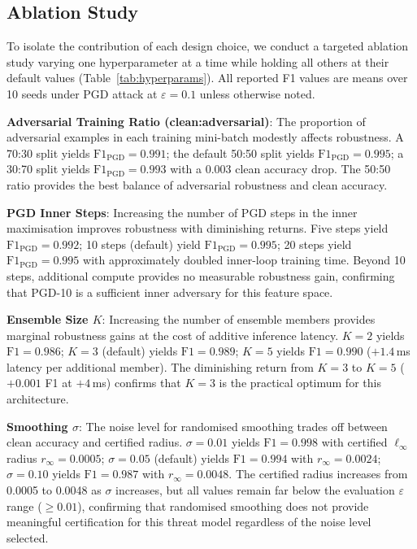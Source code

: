 \documentclass[conference]{IEEEtran}
\begin{document}
\subsection{Ablation Study}
\label{sec:ablation}

To isolate the contribution of each design choice, we conduct a targeted ablation study varying one hyperparameter at a time while holding all others at their default values (Table~\ref{tab:hyperparams}). All reported F1 values are means over 10 seeds under PGD attack at $\varepsilon=0.1$ unless otherwise noted.

\textbf{Adversarial Training Ratio (clean:adversarial)}: The proportion of adversarial examples in each training mini-batch modestly affects robustness. A 70:30 split yields $\text{F1}_{\text{PGD}}=0.991$; the default 50:50 split yields $\text{F1}_{\text{PGD}}=0.995$; a 30:70 split yields $\text{F1}_{\text{PGD}}=0.993$ with a 0.003 clean accuracy drop. The 50:50 ratio provides the best balance of adversarial robustness and clean accuracy.

\textbf{PGD Inner Steps}: Increasing the number of PGD steps in the inner maximisation improves robustness with diminishing returns. Five steps yield $\text{F1}_{\text{PGD}}=0.992$; 10 steps (default) yield $\text{F1}_{\text{PGD}}=0.995$; 20 steps yield $\text{F1}_{\text{PGD}}=0.995$ with approximately doubled inner-loop training time. Beyond 10 steps, additional compute provides no measurable robustness gain, confirming that PGD-10 is a sufficient inner adversary for this feature space.

\textbf{Ensemble Size $K$}: Increasing the number of ensemble members provides marginal robustness gains at the cost of additive inference latency. $K=2$ yields $\text{F1}=0.986$; $K=3$ (default) yields $\text{F1}=0.989$; $K=5$ yields $\text{F1}=0.990$ ($+1.4$\,ms latency per additional member). The diminishing return from $K=3$ to $K=5$ ($+0.001$ F1 at $+4$\,ms) confirms that $K=3$ is the practical optimum for this architecture.

\textbf{Smoothing $\sigma$}: The noise level for randomised smoothing trades off between clean accuracy and certified radius. $\sigma=0.01$ yields $\text{F1}=0.998$ with certified $\ell_\infty$ radius $r_\infty=0.0005$; $\sigma=0.05$ (default) yields $\text{F1}=0.994$ with $r_\infty=0.0024$; $\sigma=0.10$ yields $\text{F1}=0.987$ with $r_\infty=0.0048$. The certified radius increases from 0.0005 to 0.0048 as $\sigma$ increases, but all values remain far below the evaluation $\varepsilon$ range ($\geq 0.01$), confirming that randomised smoothing does not provide meaningful certification for this threat model regardless of the noise level selected.
\end{document}
